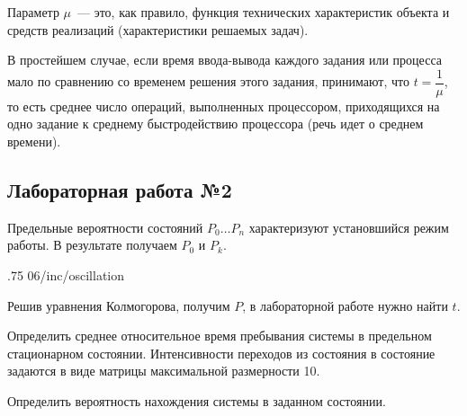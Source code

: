 Параметр $\mu$~--- это, как правило, функция технических характеристик объекта и средств реализаций (характеристики решаемых задач).

В простейшем случае, если время ввода-вывода каждого задания или процесса мало по сравнению со временем решения этого задания, принимают, что ${t = \dfrac{1}{\mu}}$, то есть среднее число операций, выполненных процессором, приходящихся на одно задание к среднему быстродействию процессора (речь идет о среднем времени).

\subsection{Лабораторная работа №2}

Предельные вероятности состояний $P_0\dots P_n$ характеризуют установшийся режим работы. В результате получаем $P_0$ и $P_k$.

\image
{.75\textwidth}
{06/inc/oscillation}
{}

Решив уравнения Колмогорова, получим $P$, в лабораторной работе нужно найти $t$.

Определить среднее относительное время пребывания системы в предельном стационарном состоянии. Интенсивности переходов из состояния в состояние задаются в виде матрицы максимальной размерности 10.

Определить вероятность нахождения системы в заданном состоянии.